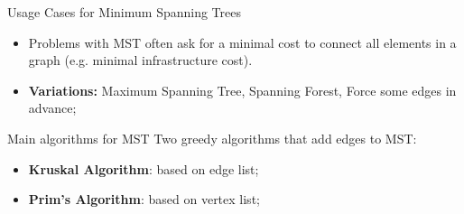 \begin{frame}
\begin{columns}[T]
  \end{columns}
\end{frame}

\begin{frame}{Usage Cases for Minimum Spanning Trees}
  \begin{block}{}
    \begin{itemize}
      \item Problems with MST often ask for a minimal cost to connect all elements in a graph (e.g. minimal infrastructure cost).\medskip

      \item {\bf Variations:} Maximum Spanning Tree, Spanning Forest, Force some edges in advance;
    \end{itemize}
  \end{block}

  \begin{exampleblock}{Main algorithms for MST}
    Two greedy algorithms that add edges to MST:
    \begin{itemize}
      \item {\bf Kruskal Algorithm}: based on edge list;
      \item {\bf Prim's Algorithm}: based on vertex list;
    \end{itemize}
  \end{exampleblock}
\end{frame}

